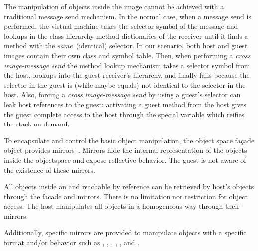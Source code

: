The manipulation of objects inside the \objectspace image cannot be achieved with a traditional message send mechanism. In the normal case, when a message send is performed, the virtual machine takes the selector symbol of the message and lookups in the class hierarchy method dictionaries of the receiver until it finds a method with the \emph{same}~(identical) selector. In our scenario, both host and guest images contain their own  class and symbol table. Then, when performing a \emph{cross image-message send} the method lookup mechanism takes a selector symbol from the host, lookups into the guest receiver's hierarchy, and finally fails because  the selector in the guest is (while maybe equals) not identical to the selector in the host. Also, forcing a \emph{cross image-message send} by using a guest's selector can leak host references to the guest: activating a guest method from the host gives the guest complete access to the host through the  special variable which reifies the stack on-demand.

To encapsulate and control the basic object manipulation, the object space fa\c{c}ade object provides mirrors~\cite{Brac04b}. Mirrors hide the internal representation of the objects inside the objectspace and expose reflective behavior. The guest is not aware of the existence of these mirrors.

All objects inside an \objectspace and reachable by reference can be retrieved by host's objects through the \objectspace facade and mirrors. 
There is no limitation nor restriction for object access. 
The host manipulates all objects in a homogeneous way through their mirrors. 

Additionally, specific mirrors are provided to manipulate objects with a specific format and/or behavior such as , , , , , and .



